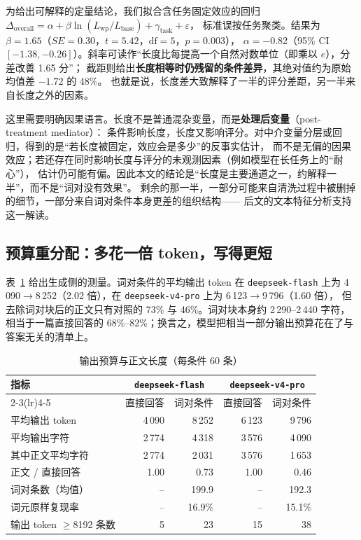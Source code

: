 \documentclass[UTF8,11pt,a4paper]{ctexart}
\newcommand{\deepflash}{\texttt{deepseek-flash}}
\newcommand{\deeppro}{\texttt{deepseek-v4-pro}}
\begin{document}
为给出可解释的定量结论，我们拟合含任务固定效应的回归
$\Delta_{\text{overall}}=\alpha+\beta\ln(L_{\text{wp}}/L_{\text{base}})+\gamma_{\text{task}}+\varepsilon$，
标准误按任务聚类。结果为 $\beta=1.65$（$SE=0.30$，$t=5.42$，$\mathrm{df}=5$，$p=0.003$），
$\alpha=-0.82$（95\% CI $[-1.38, -0.26]$）。斜率可读作“长度比每提高一个自然对数单位（即乘以 $e$），分差改善 1.65 分”；
截距则给出\textbf{长度相等时仍残留的条件差异}，其绝对值约为原始均值差 $-1.72$ 的 48\%。
也就是说，长度差大致解释了一半的评分差距，另一半来自长度之外的因素。

这里需要明确因果语言。长度不是普通混杂变量，而是\textbf{处理后变量}（post-treatment mediator）：
条件影响长度，长度又影响评分。对中介变量分层或回归，得到的是“若长度被固定，效应会是多少”的反事实估计，
而不是无偏的因果效应；若还存在同时影响长度与评分的未观测因素（例如模型在长任务上的“耐心”），
估计仍可能有偏。因此本文的结论是“长度是主要通道之一，约解释一半”，而不是“词对没有效果”。
剩余的那一半，一部分可能来自清洗过程中被删掉的细节，一部分来自词对条件本身更差的组织结构——
后文的文本特征分析支持这一解读。

\FloatBarrier
\subsection{预算重分配：多花一倍 token，写得更短}

表~\ref{tab:budget} 给出生成侧的测量。词对条件的平均输出 token 在 \deepflash{} 上为
4\,090$\to$8\,252（2.02 倍），在 \deeppro{} 上为 6\,123$\to$9\,796（1.60 倍），
但去除词对块后的正文只有对照的 73\% 与 46\%。词对块本身约 2\,290--2\,440 字符，
相当于一篇直接回答的 68\%--82\%；换言之，模型把相当一部分输出预算花在了与答案无关的清单上。

\begin{table}[t]
\centering
\caption{输出预算与正文长度（每条件 60 条）}\label{tab:budget}
\small
\begin{tabular}{@{}lrrrr@{}}
\toprule
\multirow{2}{*}{指标} & \multicolumn{2}{c}{\deepflash} & \multicolumn{2}{c}{\deeppro} \\
\cmidrule(lr){2-3}\cmidrule(lr){4-5}
 & 直接回答 & 词对条件 & 直接回答 & 词对条件 \\
\midrule
平均输出 token & 4\,090 & 8\,252 & 6\,123 & 9\,796 \\
平均输出字符 & 2\,774 & 4\,318 & 3\,576 & 4\,090 \\
其中正文平均字符 & 2\,774 & 2\,031 & 3\,576 & 1\,653 \\
正文 / 直接回答 & 1.00 & 0.73 & 1.00 & 0.46 \\
词对条数（均值） & -- & 199.9 & -- & 192.3 \\
词元原样复现率 & -- & 16.9\% & -- & 15.1\% \\
输出 token $\ge$8192 条数 & 5 & 23 & 15 & 38 \\
\bottomrule
\end{tabular}
\end{table}
\end{document}
